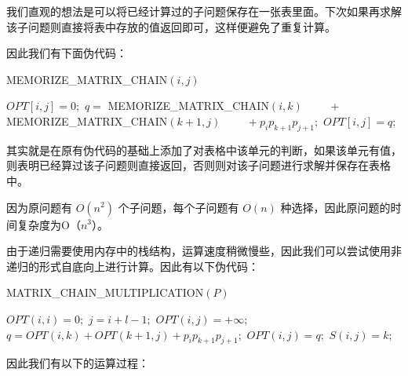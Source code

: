 \newpage
我们直观的想法是可以将已经计算过的子问题保存在一张表里面。下次如果再求解该子问题则直接将表中存放的值返回即可，这样便避免了重复计算。

因此我们有下面伪代码：
\\

\begin{small}
{\sc MEMORIZE\_MATRIX\_CHAIN}$( i, j)$
\begin{algorithmic}[1]
\IF{ \textcolor{red}{ $OPT[i, j] \neq NULL $ } }
\RETURN{ \textcolor{red}{ $OPT(i, j)$; } }
\ENDIF
{}
\STATE $OPT[ i, j] = 0;$
\ELSE
{}
\STATE $q = $   {\sc MEMORIZE\_MATRIX\_CHAIN}$(i, k)$
\STATE $\qquad  + ${\sc MEMORIZE\_MATRIX\_CHAIN}$( k+1, j)$
\STATE $\qquad  + p_ip_{k+1}p_{j+1} ;$
\STATE $OPT[i, j] = q;$
\ENDIF
\ENDFOR
\ENDIF
{}
\end{algorithmic}
\end{small}

\indent

其实就是在原有伪代码的基础上添加了对表格中该单元的判断，如果该单元有值，则表明已经算过该子问题则直接返回，否则则对该子问题进行求解并保存在表格中。

因为原问题有 $O(n^2)$ 个子问题，每个子问题有 $O(n)$ 种选择，因此原问题的时间复杂度为O（$n^3$）。

由于递归需要使用内存中的栈结构，运算速度稍微慢些，因此我们可以尝试使用非递归的形式自底向上进行计算。因此有以下伪代码：
\\

\begin{small}
{\sc MATRIX\_CHAIN\_MULTIPLICATION}$( P)$
\begin{algorithmic}[1]
\STATE $OPT(i,i)=0;$
\ENDFOR
{}
    \STATE $j=i+l-1;$
    \STATE $OPT(i,j)=+\infty$;
      \STATE $q = OPT(i,k) + OPT(k+1,j) +  p_ip_{k+1}p_{j+1} ;$
	\STATE $OPT(i, j) = q;$
	\STATE $S(i,j) = k;$
      \ENDIF
    \ENDFOR
  \ENDFOR
\ENDFOR
{}
\end{algorithmic}
\end{small}

\indent

因此我们有以下的运算过程：

